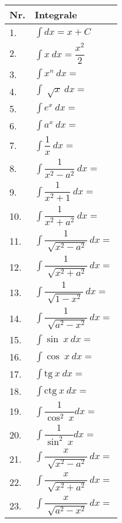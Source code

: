 \documentclass{article}
\begin{document}
\begin{table}[!ht]
\begin{minipage}{0.5\linewidth}
\begin{tabular}{|m{1cm}|m{4cm}|}
\hline
\textbf{Nr.} & \textbf{Integrale} \\
\hline
1. & $\displaystyle\int dx = x + C $ \\
\hline
2. & $\displaystyle\int x\ dx = \dfrac{x^2}{2} $ \\
\hline
3. & $\displaystyle\int x^n\ dx =  $ \\
\hline
4. & $\displaystyle\int \sqrt[]{x}\ dx =  $ \\
\hline
5. & $\displaystyle\int e^x\ dx =  $\\
\hline
6. & $\displaystyle\int a^x\ dx =  $\\
\hline
7. & $\displaystyle\int \dfrac{1}{x}\ dx =  $\\
\hline
8. & $\displaystyle\int \dfrac{1}{x^2-a^2}\ dx =  $\\
\hline
9. & $\displaystyle\int \dfrac{1}{x^2+1}\ dx =  $ \\
\hline
10. & $\displaystyle\int \dfrac{1}{x^2+a^2}\ dx =  $ \\
\hline
11. & $\displaystyle\int \dfrac{1}{\sqrt[]{x^2-a^2}}\ dx =  $ \\
\hline
12. & $\displaystyle\int \dfrac{1}{\sqrt[]{x^2+a^2}}\ dx =  $\\
\hline
13. & $\displaystyle\int \dfrac{1}{\sqrt[]{1-x^2}}\ dx =  $\\
\hline
14. & $\displaystyle\int \dfrac{1}{\sqrt[]{a^2-x^2}}\ dx =  $\\
\hline
15. & $\displaystyle\int \sin\ x\ dx =  $\\
\hline
16. & $\displaystyle\int \cos\ x\ dx =  $\\
\hline
17. & $\displaystyle\int \text{tg}\ x\ dx =  $\\
\hline
18. & $\displaystyle\int \text{ctg}\ x\ dx =  $\\
\hline
19. & $\displaystyle\int \dfrac{1}{\cos ^2\ x} dx =  $\\
\hline
20. & $\displaystyle\int \dfrac{1}{\sin ^2\ x} dx =  $\\
\hline
21. & $\displaystyle\int \dfrac{x}{\sqrt[]{x^2-a^2}}\ dx =  $\\
\hline
22. & $\displaystyle\int \dfrac{x}{\sqrt[]{x^2+a^2}}\ dx =  $\\
\hline
23. & $\displaystyle\int \dfrac{x}{\sqrt[]{a^2-x^2}}\ dx =  $\\
\hline
\end{tabular}
\end{minipage}
\end{table}
\end{document}
